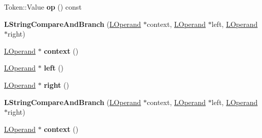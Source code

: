 \begin{DoxyCompactItemize}
\item 
Token\+::\+Value {\bfseries op} () const \hypertarget{classv8_1_1internal_1_1_l_string_compare_and_branch_a1cb19d2583db6113ac7e91498f484880}{}\label{classv8_1_1internal_1_1_l_string_compare_and_branch_a1cb19d2583db6113ac7e91498f484880}

\item 
{\bfseries L\+String\+Compare\+And\+Branch} (\hyperlink{classv8_1_1internal_1_1_l_operand}{L\+Operand} $\ast$context, \hyperlink{classv8_1_1internal_1_1_l_operand}{L\+Operand} $\ast$left, \hyperlink{classv8_1_1internal_1_1_l_operand}{L\+Operand} $\ast$right)\hypertarget{classv8_1_1internal_1_1_l_string_compare_and_branch_abdd07c36cdda51e9673d4ee4dfc2734d}{}\label{classv8_1_1internal_1_1_l_string_compare_and_branch_abdd07c36cdda51e9673d4ee4dfc2734d}

\item 
\hyperlink{classv8_1_1internal_1_1_l_operand}{L\+Operand} $\ast$ {\bfseries context} ()\hypertarget{classv8_1_1internal_1_1_l_string_compare_and_branch_a15d4b6ad859b22bf4141edc055fe8050}{}\label{classv8_1_1internal_1_1_l_string_compare_and_branch_a15d4b6ad859b22bf4141edc055fe8050}

\item 
\hyperlink{classv8_1_1internal_1_1_l_operand}{L\+Operand} $\ast$ {\bfseries left} ()\hypertarget{classv8_1_1internal_1_1_l_string_compare_and_branch_a03846e908189b71209c862508f37b51a}{}\label{classv8_1_1internal_1_1_l_string_compare_and_branch_a03846e908189b71209c862508f37b51a}

\item 
\hyperlink{classv8_1_1internal_1_1_l_operand}{L\+Operand} $\ast$ {\bfseries right} ()\hypertarget{classv8_1_1internal_1_1_l_string_compare_and_branch_acb46bd2af08a91bc102ec2b5e919c6b5}{}\label{classv8_1_1internal_1_1_l_string_compare_and_branch_acb46bd2af08a91bc102ec2b5e919c6b5}

\item 
{\bfseries L\+String\+Compare\+And\+Branch} (\hyperlink{classv8_1_1internal_1_1_l_operand}{L\+Operand} $\ast$context, \hyperlink{classv8_1_1internal_1_1_l_operand}{L\+Operand} $\ast$left, \hyperlink{classv8_1_1internal_1_1_l_operand}{L\+Operand} $\ast$right)\hypertarget{classv8_1_1internal_1_1_l_string_compare_and_branch_abdd07c36cdda51e9673d4ee4dfc2734d}{}\label{classv8_1_1internal_1_1_l_string_compare_and_branch_abdd07c36cdda51e9673d4ee4dfc2734d}

\item 
\hyperlink{classv8_1_1internal_1_1_l_operand}{L\+Operand} $\ast$ {\bfseries context} ()\hypertarget{classv8_1_1internal_1_1_l_string_compare_and_branch_a15d4b6ad859b22bf4141edc055fe8050}{}\label{classv8_1_1internal_1_1_l_string_compare_and_branch_a15d4b6ad859b22bf4141edc055fe8050}


\end{DoxyCompactItemize}
